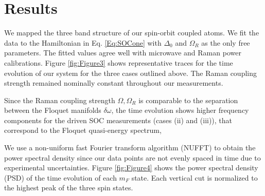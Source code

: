 \section{Results}

We mapped the three band structure of our spin-orbit coupled atoms. We fit the data to the Hamiltonian in Eq. \ref{Eq:SOCone} with $\Delta_0$ and $\Omega_R$ as the only free parameters. The fitted values agree well with microwave and Raman power calibrations. Figure \ref{fig:Figure3} shows representative traces for the time evolution of our system for the three cases outlined above. The Raman coupling strength remained nominally constant throughout our measurements. 


Since the Raman coupling strength $\Omega, \Omega_R$ is comparable to the separation between the Floquet manifolds $\delta\omega$, the time evolution shows higher frequency components for the driven SOC measurements (cases (ii) and (iii)), that correspond to the Floquet quasi-energy spectrum,  

We use a non-uniform fast Fourier transform algorithm (NUFFT) to obtain the power spectral density since our data points are not evenly spaced in time due to experimental uncertainties. Figure \ref{fig:Figure4} shows the power spectral density (PSD) of the time evolution of each $m_F$ state. Each vertical cut is normalized to the highest peak of the three spin states.
	


